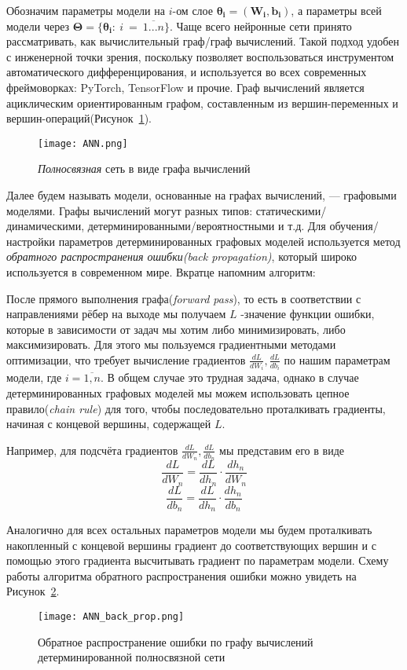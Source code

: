 Обозначим параметры модели на $i$-ом слое $\bm{\theta_i} = (\bm{W_i}, \bm{b_i})$, а параметры всей модели через $\bm{\Theta} = \{\bm{\theta_i} :~i~=~\overline{1...n}\}$.
Чаще всего нейронные сети принято рассматривать, как вычислительный граф/граф вычислений.
 Такой подход удобен с инженерной точки зрения, поскольку позволяет воспользоваться инструментом автоматического
 дифференцирования, и используется во всех современных фреймоворках: PyTorch, TensorFlow и прочие.
 Граф вычислений является ациклическим ориентированным графом, составленным из вершин-переменных и вершин-операций(Рисунок~\ref{fig:ANN}).
\begin{figure}[H]
    \centering
    \texttt{[image: ANN.png]}
    \caption{\textit{Полносвязная} сеть в виде графа вычислений}
    \label{fig:ANN}
\end{figure}

Далее будем называть модели, основанные на графах вычислений, --- графовыми моделями. Графы вычислений могут разных типов:
 статическими/динамическими, детерминированными/вероятностными и т.д. Для обучения/настройки параметров детерминированных графовых моделей
 используется метод \textit{обратного распространения ошибки(back propagation)}, который широко используется в современном мире. Вкратце напомним алгоритм:

После прямого выполнения графа(\textit{forward pass}), то есть в соответствии с направлениями рёбер на выходе мы получаем
 $L$ -значение функции ошибки, которые в зависимости от задач мы хотим либо минимизировать, либо максимизировать. Для этого
 мы пользуемся градиентными методами оптимизации, что требует вычисление градиентов $\frac{dL}{d W_i}, \frac{dL}{d b_i}$ по нашим параметрам модели, где $i = \overline{1,n}$.
 В общем случае это трудная задача, однако в случае детерминированных графовых моделей мы можем использовать цепное правило(\textit{chain rule}) для того, чтобы последовательно
 проталкивать градиенты, начиная с концевой вершины, содержащей $L$.

 Например, для подсчёта градиентов $\frac{dL}{d W_n}, \frac{dL}{d b_n}$ мы представим его в виде
 $$\frac{dL}{d W_n} = \frac{dL}{d h_n} \cdot \frac{d h_n}{d W_n}$$
 $$\frac{dL}{d b_n} = \frac{dL}{d h_n} \cdot \frac{d h_n}{d b_n}$$

Аналогично для всех остальных параметров модели мы будем проталкивать накопленный с концевой вершины градиент до соответствующих вершин и
 с помощью этого градиента высчитывать градиент по параметрам модели. Схему работы алгоритма обратного распространения ошибки
 можно увидеть на Рисунок~\ref{fig:ANN_back_prop}.
\begin{figure}[H]
    \centering
    \texttt{[image: ANN\_back\_prop.png]}
    \caption{Обратное распространение ошибки по графу вычислений детерминированной полносвязной сети}
    \label{fig:ANN_back_prop}
\end{figure}

